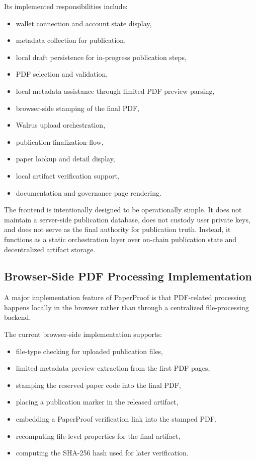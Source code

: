 \documentclass[journal]{IEEEtran}
\begin{document}
Its implemented responsibilities include:
\begin{itemize}
    \item wallet connection and account state display,
    \item metadata collection for publication,
    \item local draft persistence for in-progress publication steps,
    \item PDF selection and validation,
    \item local metadata assistance through limited PDF preview parsing,
    \item browser-side stamping of the final PDF,
    \item Walrus upload orchestration,
    \item publication finalization flow,
    \item paper lookup and detail display,
    \item local artifact verification support,
    \item documentation and governance page rendering.
\end{itemize}


The frontend is intentionally designed to be operationally simple. It does not maintain a server-side publication database, does not custody user private keys, and does not serve as the final authority for publication truth. Instead, it functions as a static orchestration layer over on-chain publication state and decentralized artifact storage.

\subsection{Browser-Side PDF Processing Implementation}

A major implementation feature of PaperProof is that PDF-related processing happens locally in the browser rather than through a centralized file-processing backend.

The current browser-side implementation supports:
\begin{itemize}
    \item file-type checking for uploaded publication files,
    \item limited metadata preview extraction from the first PDF pages,
    \item stamping the reserved paper code into the final PDF,
    \item placing a publication marker in the released artifact,
    \item embedding a PaperProof verification link into the stamped PDF,
    \item recomputing file-level properties for the final artifact,
    \item computing the SHA-256 hash used for later verification.
\end{itemize}
\end{document}
